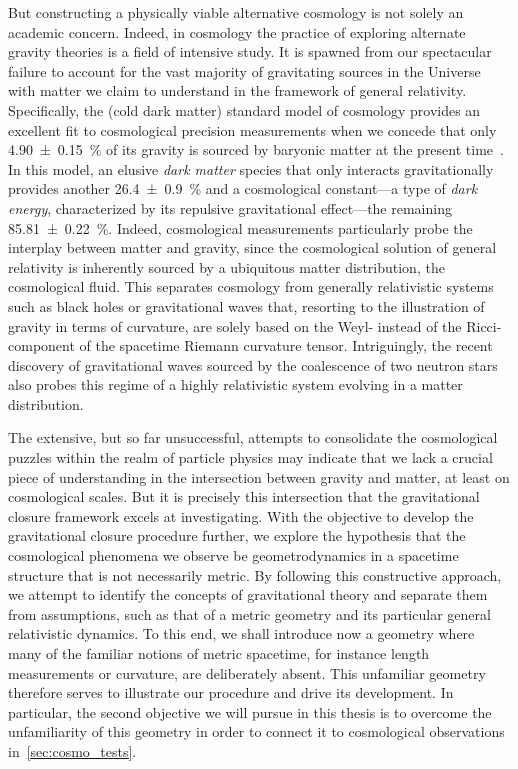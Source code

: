 
But constructing a physically viable alternative cosmology is not solely an academic concern. Indeed, in cosmology the practice of exploring alternate gravity theories is a field of intensive study. It is spawned from our spectacular failure to account for the vast majority of gravitating sources in the Universe with matter we claim to understand in the framework of general relativity. Specifically, the \LCDM{} (cold dark matter) standard model of cosmology provides an excellent fit to cosmological precision measurements when we concede that only \SI{4.90+-0.15}{\percent} of its gravity is sourced by baryonic matter at the present time~\autocite{Planck2015}. In this model, an elusive \emph{dark matter} species that only interacts gravitationally provides another \SI{26.4+-0.9}{\percent} and a cosmological constant---a type of \emph{dark energy}, characterized by its repulsive gravitational effect---the remaining \SI{85.81+-0.22}{\percent}. Indeed, cosmological measurements particularly probe the interplay between matter and gravity, since the cosmological solution of general relativity is inherently sourced by a ubiquitous matter distribution, the cosmological fluid. This separates cosmology from generally relativistic systems such as black holes or gravitational waves that, resorting to the illustration of gravity in terms of curvature, are solely based on the Weyl- instead of the Ricci-component of the spacetime Riemann curvature tensor. Intriguingly, the recent discovery of gravitational waves sourced by the coalescence of two neutron stars~\autocite{GW170817} also probes this regime of a highly relativistic system evolving in a matter distribution.


The extensive, but so far unsuccessful, attempts to consolidate the cosmological puzzles within the realm of particle physics may indicate that we lack a crucial piece of understanding in the intersection between gravity and matter, at least on cosmological scales. But it is precisely this intersection that the gravitational closure framework excels at investigating. With the objective to develop the gravitational closure procedure further, we explore the hypothesis that the cosmological phenomena we observe be geometrodynamics in a spacetime structure that is not necessarily metric. By following this constructive approach, we attempt to identify the concepts of gravitational theory and separate them from assumptions, such as that of a metric geometry and its particular general relativistic dynamics. To this end, we shall introduce now a geometry where many of the familiar notions of metric spacetime, for instance length measurements or curvature, are deliberately absent. This unfamiliar geometry therefore serves to illustrate our procedure and drive its development. In particular, the second objective we will pursue in this thesis is to overcome the unfamiliarity of this geometry in order to connect it to cosmological observations in~\autoref{sec:cosmo_tests}.

